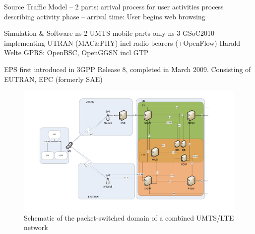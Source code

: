Source Traffic Model
	-- 2 parts: 
		arrival process for user activities
		process describing activity phase
	-- arrival time:
		User begins web browsing
	
Simulation \& Software
	ns-2 UMTS mobile parts only
	ns-3 GSoC2010 implementing \ac{UTRAN} (MAC\&PHY) incl radio bearers (+OpenFlow)
	Harald Welte GPRS: OpenBSC, OpenGGSN incl GTP
	

EPS first introduced in 3GPP Release 8, completed in March 2009. Consisting of EUTRAN, EPC (formerly SAE)


	


\begin{figure}[htbp]
	\centering
 	\includegraphics[width=1.3\textwidth]{images/eps_ps-overview.pdf}
 	\caption{Schematic of the packet-switched domain of a combined UMTS/LTE network}
 	\label{c4:fig:psdomain}
\end{figure}

